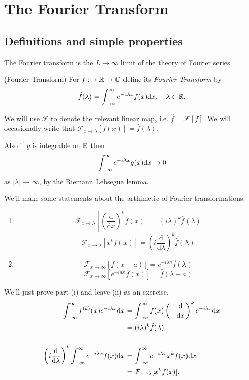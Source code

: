 \documentclass{article}
\begin{document}
\section{The Fourier Transform}
\subsection{Definitions and simple properties}
The Fourier transform is the $ L\to \infty $ limit of the theory of Fourier series.
\begin{definition}
	(Fourier Transform) For $ f:\to \mathbb{R}\to \mathbb{C} $ define its \textit{Fourier Transform} by
	\[
		\hat f(\lambda)=\int_{-\infty}^\infty e^{-i\lambda x}f(x)\mathrm dx,\quad \lambda\in \mathbb{R}.
	\]
\end{definition}
We will use $ \mathcal F $ to denote the relevant linear map, i.e. $ \hat f=\mathcal F[f] $. We will occasionally write that $ \mathcal F_{x\to \lambda}[f(x)]=\hat f(\lambda) $.\par
Also if $ g $ is integrable on $ \mathbb{R} $ then
\[
	\int_{-\infty}^\infty  e^{-i\lambda x}g(x)\mathrm dx\to0
\]
as $ |\lambda|\to\infty $, by the Riemann Lebsegue lemma.
\begin{proposition}
	We'll make some statements about the arthimetic of Fourier transformations.
	\begin{enumerate}
		\item 
			\[
				\mathcal F_{x\to \lambda}\left[\left(\frac{\mathrm d}{\mathrm dx}\right)^kf(x)\right]=(i\lambda)^k\hat f(\lambda)
			\]
			\[
				\mathcal F_{x\to \lambda}\left[x^kf(x)\right]=\left(i\frac{\mathrm d}{\mathrm d\lambda}\right)^k\hat f(\lambda)
			\]
		\item 
			\[
				\mathcal F_{x\to \infty}[f(x-a)]=e^{-i\lambda a}\hat f(\lambda)
			\]
			\[
				\mathcal F_{x\to\infty}[e^{-iax}f(x)]=\hat f(\lambda +a)
			\]
	\end{enumerate}
\end{proposition}
\pf We'll just prove part (i) and leave (ii) as an exercise.
\begin{align*}
	\int_{-\infty}^\infty f^{(k)}(x)e^{-i\lambda x}\mathrm dx&=\int_{-\infty}^\infty f(x)\left(-\frac{\mathrm d}{\mathrm dx}\right)^ke^{-i\lambda x}\mathrm dx\\
	&=(i\lambda)^k\hat f(\lambda).\\\\
	\left(i\frac{\mathrm d}{\mathrm d\lambda}\right)^k\int_{-\infty}^\infty e^{-i\lambda x}f(x)\mathrm dx
	&= \int_{-\infty}^\infty e^{-i\lambda x}x^kf(x)\mathrm dx\\
	&= \mathcal F_{x\to\lambda}[x^kf(x)].
\end{align*}
\end{document}
